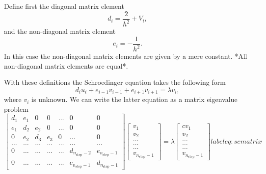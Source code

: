Define first the diagonal matrix element
\[
   d_i=\frac{2}{h^2}+V_i,
\]
and the non-diagonal matrix element
\[
   e_i=-\frac{1}{h^2}.
\]
In this case the non-diagonal matrix elements are given by a mere constant. *All non-diagonal matrix elements are equal*.

With these definitions the Schroedinger equation takes the following form
\[
d_iu_i+e_{i-1}v_{i-1}+e_{i+1}v_{i+1}  = \lambda v_i,
\]
where $v_i$ is unknown. We can write the
latter equation as a matrix eigenvalue problem
\begin{equation}
    \begin{bmatrix} d_1 & e_1 & 0   & 0    & \dots  &0     & 0 \\
                                e_1 & d_2 & e_2 & 0    & \dots  &0     &0 \\
                                0   & e_2 & d_3 & e_3  &0       &\dots & 0\\
                                \dots  & \dots & \dots & \dots  &\dots      &\dots & \dots\\
                                0   & \dots & \dots & \dots  &\dots       &d_{n_{\mathrm{step}}-2} & e_{n_{\mathrm{step}}-1}\\
                                0   & \dots & \dots & \dots  &\dots       &e_{n_{\mathrm{step}}-1} & d_{n_{\mathrm{step}}-1}

             \end{bmatrix}      \begin{bmatrix} v_{1} \\
                                                              v_{2} \\
                                                              \dots\\ \dots\\ \dots\\
                                                              v_{n_{\mathrm{step}}-1}
             \end{bmatrix}=\lambda \begin{bmatrix}{c} v_{1} \\
                                                              v_{2} \\
                                                              \dots\\ \dots\\ \dots\\
                                                              v_{n_{\mathrm{step}}-1}
             \end{bmatrix}
      label{eq:sematrix}
\end{equation}
